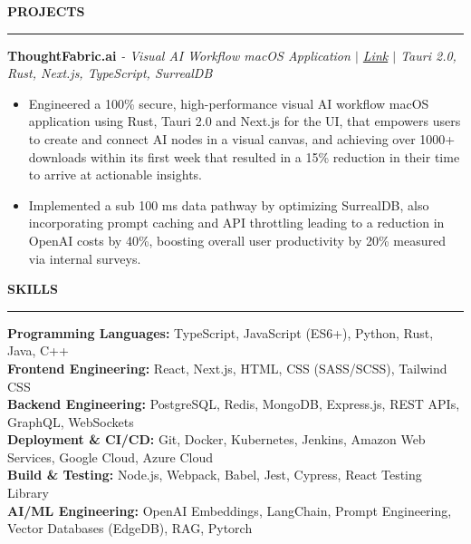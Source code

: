 \documentclass[10pt,letterpaper]{article}
\begin{document}
\vspace{mm}
{\hspace{0in}\small\textbf{PROJECTS}}\par
\vspace{-2mm}
\noindent\rule{\textwidth}{0.1pt}
\vspace{-4mm}

\hspace{0in}\textbf{ThoughtFabric.ai}  \textit{- Visual AI Workflow macOS Application $|$ \href{https://thoughtfabric.ai}{Link} $|$ Tauri 2.0, Rust, Next.js, TypeScript, SurrealDB}
\begin{itemize}[leftmargin=0.15in,nosep,topsep=1pt,itemsep=0.5mm]
     \item Engineered a 100\% secure, high-performance visual AI workflow macOS application using Rust, Tauri 2.0 and Next.js for the UI, that empowers users to create and connect AI nodes in a visual canvas, and achieving over 1000+ downloads within its first week that resulted in a 15\% reduction in their time to arrive at actionable insights.   
     \item Implemented a sub 100 ms data pathway by optimizing SurrealDB, also incorporating prompt caching and API throttling leading to a reduction in OpenAI costs by 40\%, boosting overall user productivity by 20\% measured via internal surveys.
\end{itemize}

\vspace{2mm}
{\hspace{0in}\small\textbf{SKILLS}}\par
\vspace{-2mm}
\noindent\rule{\textwidth}{0.1pt}
\vspace{-4mm}

\hspace{0in}\textbf{Programming Languages:} TypeScript, JavaScript (ES6+), Python, Rust, Java, C++\\
\hspace{0.25in}\textbf{Frontend Engineering:} React, Next.js, HTML, CSS (SASS/SCSS), Tailwind CSS\\
\hspace{0.25in}\textbf{Backend Engineering:} PostgreSQL, Redis, MongoDB, Express.js, REST APIs, GraphQL, WebSockets \\
\hspace{0.25in}\textbf{Deployment \& CI/CD:} Git, Docker, Kubernetes, Jenkins,  Amazon Web Services, Google Cloud, Azure Cloud\\
\hspace{0.25in}\textbf{Build \& Testing:} Node.js, Webpack, Babel, Jest, Cypress, React Testing Library\\
\hspace{0.25in}\textbf{AI/ML Engineering:} OpenAI Embeddings, LangChain, Prompt Engineering, Vector Databases (EdgeDB), RAG, Pytorch
\end{document}
